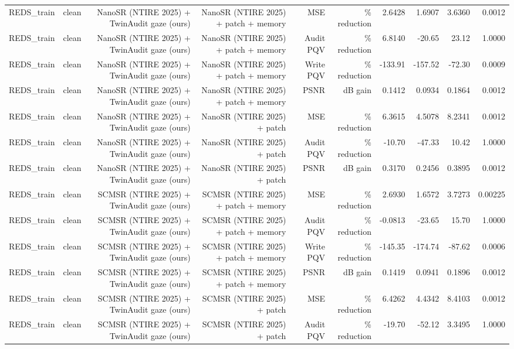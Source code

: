 \begin{table}[t]
\begin{tabular}{llrrrrrrrr}
REDS\_train & clean & NanoSR (NTIRE 2025) + TwinAudit gaze (ours) & NanoSR (NTIRE 2025) + patch + memory & MSE & \% reduction & 2.6428 & 1.6907 & 3.6360 & 0.0012 \\
REDS\_train & clean & NanoSR (NTIRE 2025) + TwinAudit gaze (ours) & NanoSR (NTIRE 2025) + patch + memory & Audit PQV & \% reduction & 6.8140 & -20.65 & 23.12 & 1.0000 \\
REDS\_train & clean & NanoSR (NTIRE 2025) + TwinAudit gaze (ours) & NanoSR (NTIRE 2025) + patch + memory & Write PQV & \% reduction & -133.91 & -157.52 & -72.30 & 0.0009 \\
REDS\_train & clean & NanoSR (NTIRE 2025) + TwinAudit gaze (ours) & NanoSR (NTIRE 2025) + patch + memory & PSNR & dB gain & 0.1412 & 0.0934 & 0.1864 & 0.0012 \\
REDS\_train & clean & NanoSR (NTIRE 2025) + TwinAudit gaze (ours) & NanoSR (NTIRE 2025) + patch & MSE & \% reduction & 6.3615 & 4.5078 & 8.2341 & 0.0012 \\
REDS\_train & clean & NanoSR (NTIRE 2025) + TwinAudit gaze (ours) & NanoSR (NTIRE 2025) + patch & Audit PQV & \% reduction & -10.70 & -47.33 & 10.42 & 1.0000 \\
REDS\_train & clean & NanoSR (NTIRE 2025) + TwinAudit gaze (ours) & NanoSR (NTIRE 2025) + patch & PSNR & dB gain & 0.3170 & 0.2456 & 0.3895 & 0.0012 \\
REDS\_train & clean & SCMSR (NTIRE 2025) + TwinAudit gaze (ours) & SCMSR (NTIRE 2025) + patch + memory & MSE & \% reduction & 2.6930 & 1.6572 & 3.7273 & 0.00225 \\
REDS\_train & clean & SCMSR (NTIRE 2025) + TwinAudit gaze (ours) & SCMSR (NTIRE 2025) + patch + memory & Audit PQV & \% reduction & -0.0813 & -23.65 & 15.70 & 1.0000 \\
REDS\_train & clean & SCMSR (NTIRE 2025) + TwinAudit gaze (ours) & SCMSR (NTIRE 2025) + patch + memory & Write PQV & \% reduction & -145.35 & -174.74 & -87.62 & 0.0006 \\
REDS\_train & clean & SCMSR (NTIRE 2025) + TwinAudit gaze (ours) & SCMSR (NTIRE 2025) + patch + memory & PSNR & dB gain & 0.1419 & 0.0941 & 0.1896 & 0.0012 \\
REDS\_train & clean & SCMSR (NTIRE 2025) + TwinAudit gaze (ours) & SCMSR (NTIRE 2025) + patch & MSE & \% reduction & 6.4262 & 4.4342 & 8.4103 & 0.0012 \\
REDS\_train & clean & SCMSR (NTIRE 2025) + TwinAudit gaze (ours) & SCMSR (NTIRE 2025) + patch & Audit PQV & \% reduction & -19.70 & -52.12 & 3.3495 & 1.0000 \\

\end{tabular}
\end{table}
